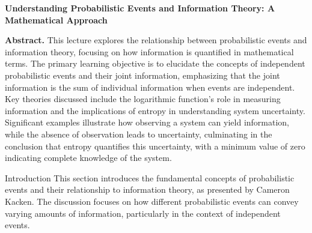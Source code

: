 \documentclass[a4paper]{article}
\begin{document}
\begin{center}
{\LARGE \textbf{Understanding Probabilistic Events and Information Theory: A Mathematical Approach}}\\[1em]
\end{center}

\textbf{Abstract.} This lecture explores the relationship between probabilistic events and information theory, focusing on how information is quantified in mathematical terms. The primary learning objective is to elucidate the concepts of independent probabilistic events and their joint information, emphasizing that the joint information is the sum of individual information when events are independent. Key theories discussed include the logarithmic function's role in measuring information and the implications of entropy in understanding system uncertainty. Significant examples illustrate how observing a system can yield information, while the absence of observation leads to uncertainty, culminating in the conclusion that entropy quantifies this uncertainty, with a minimum value of zero indicating complete knowledge of the system.

\begin{section}{Introduction}
This section introduces the fundamental concepts of probabilistic events and their relationship to information theory, as presented by Cameron Kacken. The discussion focuses on how different probabilistic events can convey varying amounts of information, particularly in the context of independent events.

\end{section}
\end{document}
